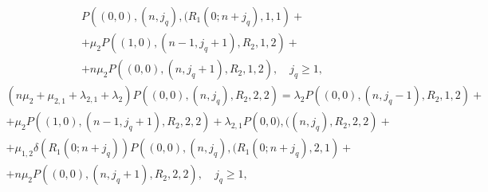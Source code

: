 \documentclass[default]{subfiles}
\begin{document}
{\begin{multline}
  P\left((0,0),(n,j_q),(R_1(0;n+j_q),1,1\right)+\\ +
  \mu_2 P\left((1,0),(n-1,j_q+1),R_2,1,2\right)+ \\ + n\mu_2
  P\left((0,0),(n,j_q+1),R_2,1,2\right), \quad j_q\geqslant  1,
\label{eq:7.3}
\end{multline}
\begin{multline}
  \left(n\mu_2+\mu_{2,1}+\lambda_{2,1}+\lambda_2\right)
  P\left((0,0),(n,j_q),R_2,2,2\right) =
  \lambda_2 P\left((0,0),(n,j_q-1),R_2,1,2\right)+ \\ +
  \mu_2  P\left((1,0),(n-1,j_q+1),R_2,2,2\right)+ \lambda_{2,1}
  P\left(0,0),((n,j_q),R_2,2,2\right)+ \\ +
  \mu_{1,2}\delta\left(R_1(0;n+j_q)\right)
  P\left((0,0),(n,j_q),(R_1(0;n+j_q),2,1\right)+\\ +
  n\mu_2 P\left((0,0),(n,j_q+1),R_2,2,2\right), \quad j_q\geqslant  1,
\label{eq:7.4}
\end{multline}

}
\end{document}
